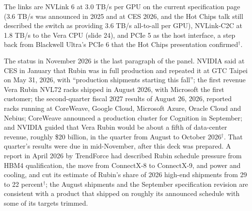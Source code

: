 \documentclass[11pt,letterpaper]{article}
\begin{document}
The links are NVLink 6 at 3.0 TB/s per GPU on the current specification page (3.6 TB/s was announced in 2025 and at CES 2026, and the Hot Chips talk still described the switch as providing 3.6 TB/s all-to-all per GPU), NVLink-C2C at 1.8 TB/s to the Vera CPU (slide 24), and PCIe 5 as the host interface, a step back from Blackwell Ultra's PCIe 6 that the Hot Chips presentation confirmed$^\dagger$.

The status in November 2026 is the last paragraph of the panel. NVIDIA said at CES in January that Rubin was in full production and repeated it at GTC Taipei on May 31, 2026, with ``production shipments starting this fall''; the first revenue Vera Rubin NVL72 racks shipped in August 2026, with Microsoft the first customer; the second-quarter fiscal 2027 results of August 26, 2026, reported racks running at CoreWeave, Google Cloud, Microsoft Azure, Oracle Cloud and Nebius; CoreWeave announced a production cluster for Cognition in September; and NVIDIA guided that Vera Rubin would be about a fifth of data-center revenue, roughly \$20 billion, in the quarter from August to October 2026$^\dagger$. That quarter's results were due in mid-November, after this deck was prepared. A report in April 2026 by TrendForce had described Rubin schedule pressure from HBM4 qualification, the move from ConnectX-8 to ConnectX-9, and power and cooling, and cut its estimate of Rubin's share of 2026 high-end shipments from 29 to 22 percent$^\dagger$; the August shipments and the September specification revision are consistent with a product that shipped on roughly its announced schedule with some of its targets trimmed.
\end{document}
